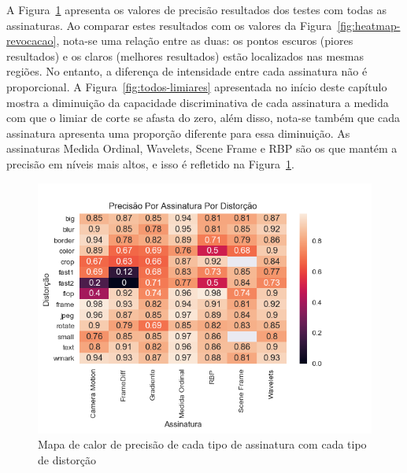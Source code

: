 A Figura~\ref{fig:heatmap-precisao} apresenta os valores de precisão resultados dos testes com todas as assinaturas. Ao comparar estes resultados com os valores da Figura~\ref{fig:heatmap-revocacao}, nota-se uma relação entre as duas: os pontos escuros (piores resultados) e os claros (melhores resultados) estão localizados nas mesmas regiões. No entanto, a diferença de intensidade entre cada assinatura não é proporcional. A Figura~\ref{fig:todos-limiares} apresentada no início deste capítulo mostra a diminuição da capacidade discriminativa de cada assinatura a medida com que o limiar de corte se afasta do zero, além disso, nota-se também que cada assinatura apresenta uma proporção diferente para essa diminuição. As assinaturas Medida Ordinal, Wavelets, Scene Frame e RBP são os que mantém a precisão em níveis mais altos, e isso é refletido na Figura~\ref{fig:heatmap-precisao}.

\begin{figure}[h]
	\centering
	\caption{Mapa de calor de precisão de cada tipo de assinatura com cada tipo de distorção}
	\label{fig:heatmap-precisao}
	\includegraphics[width=\textwidth]{dados/figuras/experimentos/heatmap_final_precisao.png}	
\end{figure}

